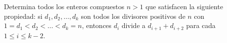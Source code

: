 Determina todos los enteros compuestos $n \gt 1$ que satisfacen la siguiente propiedad: si $d_1,d_2,\dots,d_k$ son todos los divisores positivos de $n$ con $1 = d_1 \lt d_2 \lt \dots \lt d_k = n$, entonces $d_i$ divide a $d_{i+1} +d_{i+2}$ para cada $1\leq i\leq k-2$.